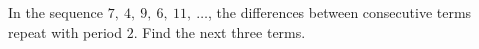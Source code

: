 In the sequence $7,\ 4,\ 9,\ 6,\ 11,\ \dots$, the differences between consecutive terms repeat with period $2$. Find the next three terms.
